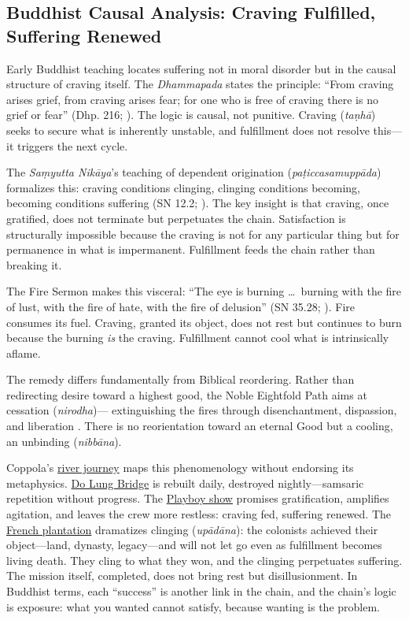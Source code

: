 \subsection*{Buddhist Causal Analysis: Craving Fulfilled, Suffering Renewed}
\label{ssec:iii-buddhist-causal-analysis}

Early Buddhist teaching locates suffering not in moral disorder but in the causal structure of
craving itself. The \emph{Dhammapada} states the principle: ``From craving arises grief, from
craving arises fear; for one who is free of craving there is no grief or fear'' (Dhp. 216;
\parencite{BuddharakkhitaDhp1993}). The logic is causal, not punitive. Craving (\emph{taṇhā})
seeks to secure what is inherently unstable, and fulfillment does not resolve this---it
triggers the next cycle.

The \emph{Saṃyutta Nikāya}'s teaching of dependent origination
(\emph{paṭiccasamuppāda}) formalizes this: craving conditions clinging, clinging conditions
becoming, becoming conditions suffering (SN 12.2; \parencite[p.~536]{BodhiSN2000}). The key
insight is that craving, once gratified, does not terminate
but perpetuates the chain. Satisfaction is structurally impossible because the craving is not
for any particular thing but for permanence in what is impermanent. Fulfillment feeds the
chain rather than breaking it.

The Fire Sermon makes this visceral: ``The eye is burning \ldots\ burning with the fire of
lust, with the fire of hate, with the fire of delusion'' (SN 35.28;
\parencite[p.~1143]{BodhiSN2000}). Fire consumes its fuel. Craving, granted its object, does
not rest but continues to burn because the burning \emph{is} the craving. Fulfillment cannot
cool what is intrinsically aflame.

The remedy differs fundamentally from Biblical reordering. Rather than redirecting desire
toward a highest good, the Noble Eightfold Path aims at cessation (\emph{nirodha})---
extinguishing the fires through disenchantment, dispassion, and liberation
\parencite[pp.~45--50]{Rahula1959}. There is no reorientation toward an eternal Good but a
cooling, an unbinding (\emph{nibbāna}).

Coppola's \hyperref[scene:upriver-journey]{river journey} maps this phenomenology without
endorsing its metaphysics. \hyperref[scene:do-lung-bridge]{Do Lung Bridge} is rebuilt daily,
destroyed nightly---samsaric repetition without progress. The
\hyperref[scene:playboy-show]{Playboy show} promises gratification, amplifies agitation, and
leaves the crew more restless: craving fed, suffering renewed. The
\hyperref[scene:french-plantation]{French plantation} dramatizes clinging (\emph{upādāna}): the
colonists achieved their object---land, dynasty, legacy---and will not let go even as
fulfillment becomes living death. They cling to what they won, and the clinging perpetuates
suffering. The mission itself, completed, does not bring rest but disillusionment. In Buddhist
terms, each ``success'' is another link in the chain, and the chain's logic is exposure: what
you wanted cannot satisfy, because wanting is the problem.
